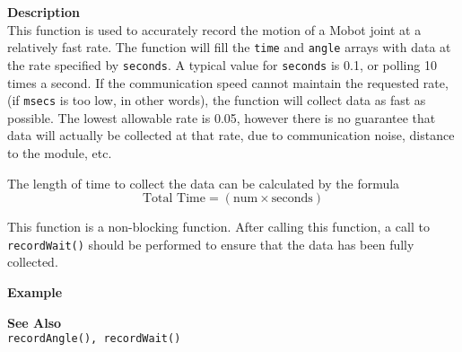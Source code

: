 \noindent
{\bf Description}\\
This function is used to accurately record the motion of a Mobot joint at a relatively fast
rate. The function will fill the \texttt{time} and \texttt{angle} arrays with data
at the rate specified by \texttt{seconds}. A typical value for \texttt{seconds} is 0.1, or
polling 10 times a second. If the communication speed cannot maintain 
the requested rate, (if \texttt{msecs} is too low, in other words), the function will
collect data as fast as possible. The lowest allowable rate is 0.05, however there is
no guarantee that data will actually be collected at that rate, due to communication noise,
distance to the module, etc.

The length of time to collect the data can be calculated by the formula \\
\begin{equation*}
\text{Total Time} = (\text{num} \times \text{seconds}) 
\end{equation*}

This function is a non-blocking function. After calling this function, a call to
\texttt{recordWait()} should be performed to ensure that the data has been fully collected.

\noindent
{\bf Example}\\
\noindent

\noindent
{\bf See Also}\\
\texttt{recordAngle(), recordWait()}\\
